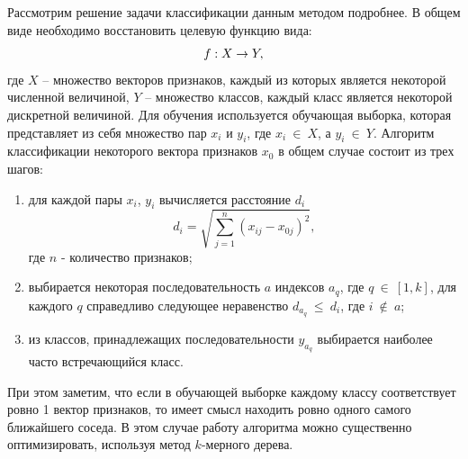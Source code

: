 \documentclass[14pt, a4paper]{extreport}
\begin{document}
	Рассмотрим решение задачи классификации данным методом подробнее. В общем виде необходимо восстановить целевую функцию вида:
	\vspace*{-0.5cm}
	\begin{equation*}
		f: X \rightarrow Y, 
		\label{KNNf}
		\vspace*{-0.5cm}
	\end{equation*}
	где $X$ -- множество векторов признаков, каждый из которых является некоторой численной величиной, $Y$ -- множество классов, каждый класс является некоторой дискретной величиной. Для обучения используется обучающая выборка, которая представляет из себя множество пар $x_i$ и $y_i$, где $x_i~\in~X$, а $y_i~\in~Y$.
	Алгоритм классификации некоторого вектора признаков $x_0$ в общем случае состоит из трех шагов:
	\begin{enumerate}[label={\arabic*)}]
		\item для каждой пары $x_i$, $y_i$ вычисляется расстояние $d_i$
		\begin{equation*}
			d_i = \sqrt{\sum\limits_{j=1}^n (x_{ij} - x_{0j})^2}, 
			\label{disqrt}
		\end{equation*}
		где $n$ - количество признаков;
		\item выбирается некоторая последовательность $a$ индексов $a_q$, где \linebreak $q~\in~[1, k]$, для каждого $q$ справедливо следующее неравенство $d_{a_q}~\le~d_{i}$, где $i~\notin~a$;
		\item из классов, принадлежащих последовательности $y_{a_q}$ выбирается наиболее часто встречающийся класс.
	\end{enumerate}

	При этом заметим, что если в обучающей выборке каждому классу соответствует ровно 1 вектор признаков, то имеет смысл находить ровно одного самого ближайшего соседа.
	В этом случае работу алгоритма можно существенно оптимизировать, используя метод $k$-мерного дерева.
	
\end{document}
